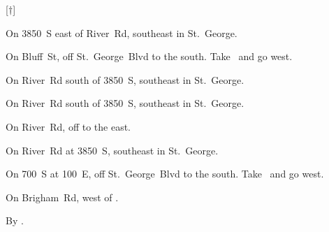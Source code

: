 
[$\dagger$]

\begin{LocationList}

On 3850~S east of River~Rd, southeast in St.~George.

On  Bluff~St, off  St.~George~Blvd to the south.
Take~  and go west.

On River~Rd south of 3850~S, southeast in St.~George.

\Location{\GarageHQ \Garage}
On River~Rd south of 3850~S, southeast in St.~George.

On River~Rd, off   to the east.

On River~Rd at 3850~S, southeast in St.~George.

\Location{\RecruitmentAgency \Recruitment}
On 700~S at 100~E, off  St.~George~Blvd to the south.
Take~  and go west.

On Brigham~Rd, west of  .

\Location{\TruckStop \Gas \Rest \Weigh}
By  .

\end{LocationList}
